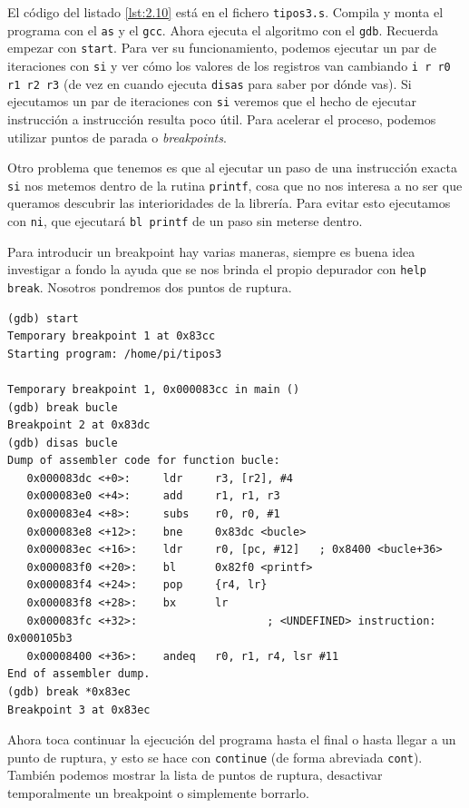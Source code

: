 El código del listado \ref{lst:2.10} está en el fichero {\tt tipos3.s}. Compila y
monta el programa con el {\tt as} y el {\tt gcc}. Ahora ejecuta el algoritmo
con el {\tt gdb}. Recuerda empezar con {\tt start}. Para ver su funcionamiento,
podemos ejecutar un par de iteraciones con {\tt si} y ver cómo los valores de
los registros van cambiando {\tt i r r0 r1 r2 r3} (de vez en cuando ejecuta
{\tt disas} para saber por dónde vas). Si ejecutamos un par de iteraciones con
{\tt si} veremos que el hecho de ejecutar instrucción a instrucción resulta
poco útil. Para acelerar el proceso, podemos utilizar puntos de parada o {\it breakpoints}.

Otro problema que tenemos es que al ejecutar un paso de una instrucción exacta {\tt si}
nos metemos dentro de la rutina {\tt printf}, cosa que no nos interesa a no ser que queramos
descubrir las interioridades de la librería. Para evitar esto ejecutamos con {\tt ni}, que
ejecutará {\tt bl printf} de un paso sin meterse dentro.

Para introducir un breakpoint hay varias maneras, siempre es buena idea investigar a fondo
la ayuda que se nos brinda el propio depurador con {\tt help break}. Nosotros pondremos dos
puntos de ruptura.

\begin{lstlisting}
(gdb) start
Temporary breakpoint 1 at 0x83cc
Starting program: /home/pi/tipos3

Temporary breakpoint 1, 0x000083cc in main ()
(gdb) break bucle
Breakpoint 2 at 0x83dc
(gdb) disas bucle
Dump of assembler code for function bucle:
   0x000083dc <+0>:     ldr     r3, [r2], #4
   0x000083e0 <+4>:     add     r1, r1, r3
   0x000083e4 <+8>:     subs    r0, r0, #1
   0x000083e8 <+12>:    bne     0x83dc <bucle>
   0x000083ec <+16>:    ldr     r0, [pc, #12]   ; 0x8400 <bucle+36>
   0x000083f0 <+20>:    bl      0x82f0 <printf>
   0x000083f4 <+24>:    pop     {r4, lr}
   0x000083f8 <+28>:    bx      lr
   0x000083fc <+32>:                    ; <UNDEFINED> instruction: 0x000105b3
   0x00008400 <+36>:    andeq   r0, r1, r4, lsr #11
End of assembler dump.
(gdb) break *0x83ec
Breakpoint 3 at 0x83ec
\end{lstlisting}

Ahora toca continuar la ejecución del programa hasta el final o hasta llegar a
un punto de ruptura, y esto se hace con {\tt continue} (de forma abreviada {\tt cont}).
También podemos mostrar la lista de puntos de ruptura, desactivar temporalmente un breakpoint
o simplemente borrarlo.

